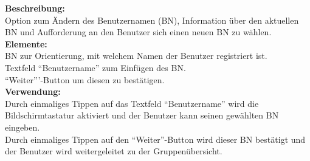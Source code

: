 \textbf{Beschreibung:}\\
Option zum Ändern des Benutzernamen (BN), Information über den aktuellen BN und Aufforderung an den Benutzer sich einen neuen BN zu wählen.\\
\textbf{Elemente:}\\
BN zur Orientierung, mit welchem Namen der Benutzer registriert ist.\\
Textfeld "`Benutzername"' zum Einfügen des BN.\\
"`Weiter"''-Button um diesen zu bestätigen.\\
\textbf{Verwendung:}\\
Durch einmaliges Tippen auf das Textfeld "`Benutzername"' wird die Bildschirmtastatur aktiviert und der Benutzer kann seinen gewählten BN eingeben.\\
Durch einmaliges Tippen auf den "`Weiter"'-Button wird dieser BN bestätigt und der Benutzer wird weitergeleitet zu der Gruppenübersicht.

\clearpage
